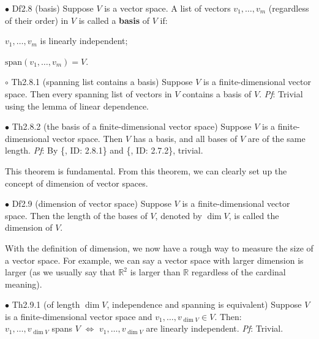\documentclass{article}
\begin{document}
\begin{Df}{$\bullet$ Df2.8 (basis)}
    Suppose $V$ is a vector space. A list of vectors $v_1, \dots, v_m$ (regardless of their order) in $V$ is called a \textbf{basis} of $V$ if:
    \begin{compactenum}
        \item $v_1, \dots, v_m$ is linearly independent;
        \item $\text{span}(v_1, \dots, v_m) = V$.
    \end{compactenum}
\end{Df}

\begin{Th}{$\circ$ Th2.8.1 (spanning list contains a basis)}
    Suppose $V$ is a finite-dimensional vector space. Then every spanning list of vectors in $V$ contains a basis of $V$.
    \tcblower
    \textit{Pf}: Trivial using the lemma of linear dependence.
\end{Th}

\begin{Th}{$\bullet$ Th2.8.2 (the basis of a finite-dimensional vector space)}
    Suppose $V$ is a finite-dimensional vector space. Then $V$ has a basis, and all bases of $V$ are of the same length.
    \tcblower
    \textit{Pf}: By \{, ID: 2.8.1\} and \{, ID: 2.7.2\}, trivial.
\end{Th}

\begin{Rmk}{}
    This theorem is fundamental. From this theorem, we can clearly set up the concept of dimension of vector spaces.
\end{Rmk}

\begin{Df}{$\bullet$ Df2.9 (dimension of vector space)}
    Suppose $V$ is a finite-dimensional vector space. Then the length of the bases of $V$, denoted by $\dim V$, is called the dimension of $V$.
\end{Df}

\begin{Rmk}{}
    With the definition of dimension, we now have a rough way to measure the size of a vector space. For example, we can say a vector space with larger dimension is larger (as we usually say that $\mathbb{R}^2$ is larger than $\mathbb{R}$ regardless of the cardinal meaning).
\end{Rmk}

\begin{Th}{$\bullet$ Th2.9.1 (of length $\dim V$, independence and spanning is equivalent)}
    Suppose $V$ is a finite-dimensional vector space and $v_1, \dots, v_{\dim V}\in V$. Then:\\
    $v_1,\dots, v_{\dim V}$ spans $V$ \quad $\Leftrightarrow$ \quad $v_1, \dots, v_{\dim V}$ are linearly independent.
    \tcblower
    \textit{Pf}: Trivial.
\end{Th}
\end{document}
